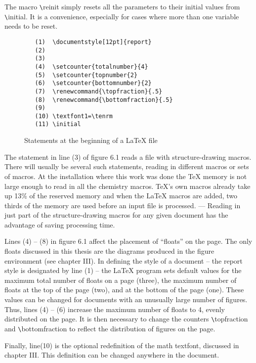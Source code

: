  The macro \verb+\+reinit simply resets all the parameters
 to their initial values from \verb+\+initial. It is a
 convenience, especially for cases where more than one
 variable needs to be reset.

 \begin{figure}\centering
  \begin{minipage}{8cm}
  \begin{verbatim}
   (1)  \documentstyle[12pt]{report}
   (2)  
   (3)  
   (4)  \setcounter{totalnumber}{4}
   (5)  \setcounter{topnumber{2}
   (6)  \setcounter{bottomnumber}{2}
   (7)  \renewcommand{\topfraction}{.5}
   (8)  \renewcommand{\bottomfraction}{.5}
   (9)  
   (10) \textfont1=\tenrm
   (11) \initial
  \end{verbatim}
  \end{minipage}
  \caption{Statements at the beginning of a LaTeX file}
 \end{figure}
 
 The statement in line (3) of figure 6.1  reads a file                      
 with structure-drawing macros. There will usually be
 several such statements, reading in different macros or
 sets of macros. At the installation where this work was
 done the TeX memory is not large enough to read in all
 the chemistry macros. TeX's own macros already take up
 13\% of the reserved memory and when the LaTeX macros are
 added, two thirds of the memory are used before an
 input file is processed. --- Reading in just part of the 
 structure-drawing macros for any given document has the
 advantage of saving processing time.
 
 Lines (4) -- (8) in figure 6.1 affect the placement of
 ``floats'' on the page. The only floats discussed in this
 thesis are the diagrams produced in the figure
 environment (see chapter III). In defining the style
 of a document -- the report style is designated by line (1) -- 
 the LaTeX program sets default values for the maximum
 total number of floats on a page (three), the maximum
 number of floats at the top of the page (two), and at
 the bottom of the page (one). These values can be 
 changed for documents with an unusually large number
 of figures. Thus, lines (4) -- (6) increase the 
 maximum number of floats to 4, evenly distributed on
 the page. It is then necessary to change the counters
 \verb+\+topfraction and \verb+\+bottomfraction to
 reflect the distribution of figures on the page.

 Finally, line(10) is the optional redefinition of the
 math textfont, discussed in chapter III. This definition
 can be changed anywhere in the document.

  
                                                                                                                                                         
 
 





